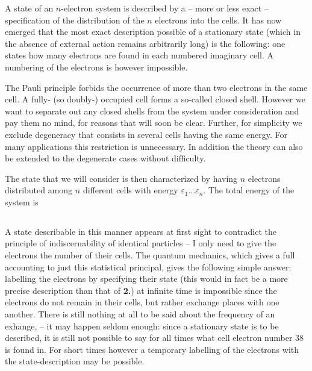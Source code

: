 \begin{paper}{1}
A state of an $n$-electron system is described by a -- more or less exact -- specification of the distribution of the $n$ electrons into the cells. It has now emerged that the most exact description possible of a stationary state (which in the absence of external action remains arbitrarily long) is the following: one states how many electrons are found in each numbered imaginary cell. A numbering of the electrons is however impossible.

The Pauli principle forbids the occurrence of more than two electrons in the same cell. A fully- (so doubly-) occupied cell forms a so-called closed shell. However we want to separate out any closed shells from the system under consideration and pay them no mind, for reasons that will soon be clear. Further, for simplicity we exclude degeneracy that consists in several cells having the same energy. For many applications this restriction is unnecessary. In addition the theory can also be extended to the degenerate cases without difficulty. 

The state that we will consider is then characterized by having $n$ electrons distributed among $n$ different cells with energy $\varepsilon_1\dots \varepsilon_n$. The total energy of the system is 

\subsection{}

A state describable in this manner appears at first sight to contradict the principle of indiscernability of identical particles -- I only need to give the electrons the number of their cells. The quantum mechanics, which gives a full accounting to just this statistical principal, gives the following simple answer: labelling the electrons by specifying their state (this would in fact be a more precise description than that of \textbf{2.}) at infinite time is impossible since the electrons do not remain in their cells, but rather exchange places with one another. There is still nothing at all to be said about the frequency of an exhange, -- it may happen seldom enough: since a stationary state is to be described, it is still not possible to say for all times what cell electron number 38 is found in. For short times however a temporary labelling of the electrons with the state-description may be possible.

\subsection{}


\end{paper}
